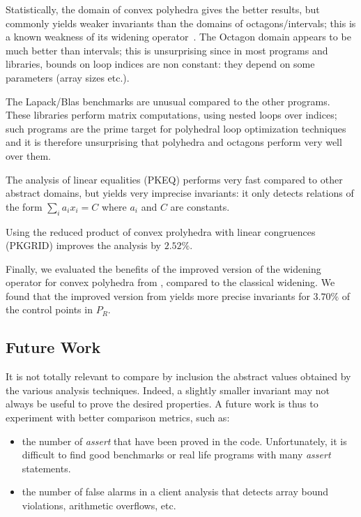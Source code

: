 \documentclass{entcs}
\begin{document}
Statistically, the domain of convex polyhedra gives the better results, but
commonly yields weaker invariants than the domains of octagons/intervals;
this is a known weakness of its widening operator~\cite{Monniaux_LeGuen2011}. 
The Octagon domain appears to be much better than intervals; this is
unsurprising since in most programs and libraries, bounds on loop indices are
non constant: they depend on some parameters (array sizes etc.).

The Lapack/Blas benchmarks are unusual compared to the other programs. These
libraries perform matrix computations, using nested loops over indices; such
programs are the prime target for polyhedral loop optimization techniques and it
is therefore unsurprising that polyhedra and octagons perform very well over them.

The analysis of linear equalities (PKEQ) performs very fast compared
to other abstract domains, but yields very imprecise invariants:
it only detects relations of the form $\sum_i a_i x_i = C$ where $a_i$ and $C$ are constants.

Using the reduced product of convex prolyhedra with linear congruences
(PKGRID) improves the analysis by $2.52\%$. 

Finally, we evaluated the benefits of the improved version of the widening
operator for convex polyhedra from \citet{BagnaraHRZ05SCP}, compared to the
classical widening. We found that the improved version from
\citet{BagnaraHRZ05SCP} yields more precise invariants for $3.70\%$ of the
control points in $P_R$.

\subsection{Future Work}
It is not totally relevant to compare by inclusion the abstract values obtained
by the various analysis techniques. Indeed, a slightly smaller invariant may not
always be useful to prove the desired properties.
A future work is thus to experiment with
better comparison metrics, such as:
\begin{itemize}
	\item the number of \emph{assert} that have been proved in the code.
		Unfortunately, it is difficult to find good benchmarks or real life
		programs with many \emph{assert} statements.
	\item the number of false alarms in a client analysis that detects array
		bound violations, arithmetic overflows, etc.
\end{itemize}

{\newcommand{\issn}[1]{{\footnotesize ISSN \href{http://www.worldcat.org/issn/#1}{#1}}}
\newcommand{\isbn}[1]{{\footnotesize ISBN \href{http://www.worldcat.org/isbn/#1}{#1}}}
\newcommand{\doix}[1]{\href{http://dx.doi.org/#1}{#1}\endgroup}
\newcommand{\doi}{\begingroup\footnotesize doi: \catcode`\_=13\def\_{\textunderscore}\doix}



}
\end{document}

